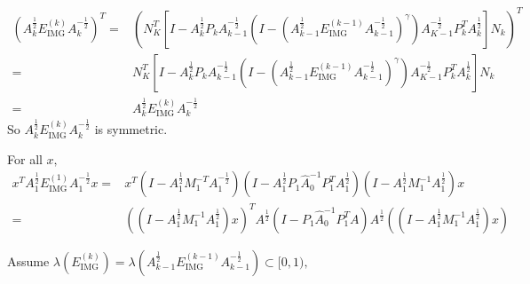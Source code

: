 \documentclass{article}
\begin{document}
\begin{equation*}
    \begin{aligned}
        (A_k^{\frac{1}{2}}E_\text{IMG}^{(k)}A_k^{-\frac{1}{2}})^T= & (N_K^T[I-A_k^{\frac{1}{2}}P_kA_{k-1}^{-\frac{1}{2}}(I-(A_{k-1}^{\frac{1}{2}}E_\text{IMG}^{(k-1)}A_{k-1}^{-\frac{1}{2}})^\gamma)A_{K-1}^{-\frac{1}{2}}P_k^TA_k^{\frac{1}{2}}]N_k)^T \\
        =                                                          & N_K^T[I-A_k^{\frac{1}{2}}P_kA_{k-1}^{-\frac{1}{2}}(I-(A_{k-1}^{\frac{1}{2}}E_\text{IMG}^{(k-1)}A_{k-1}^{-\frac{1}{2}})^\gamma)A_{K-1}^{-\frac{1}{2}}P_k^TA_k^{\frac{1}{2}}]N_k     \\
        =                                                          & A_k^{\frac{1}{2}}E_\text{IMG}^{(k)}A_k^{-\frac{1}{2}}
    \end{aligned}
\end{equation*}
So $A_k^{\frac{1}{2}}E_\text{IMG}^{(k)}A_k^{-\frac{1}{2}}$ is symmetric.

For all $ x,$
\begin{equation*}
    \begin{aligned}
        x^TA_1^{\frac{1}{2}}E_\text{IMG}^{(1)}A_1^{-\frac{1}{2}}x= & x^T (I-A_1^{\frac{1}{2}}M_1^{-T}A_1^{-\frac{1}{2}})(I-A_1^{\frac{1}{2}}P_1\hat{A}_0^{-1}P_1^TA_1^{ \frac{1}{2}})(I-A_1^{\frac{1}{2}}M_1^{-1}A_1^{\frac{1}{2}}) x  \\
        =                                                          & ((I-A_1^{\frac{1}{2}}M_1^{-1}A_1^{\frac{1}{2}}) x )^TA^{\frac{1}{2}}(I-P_1\hat{A}_0^{-1}P_1^TA)A^{\frac{1}{2}}((I-A_1^{\frac{1}{2}}M_1^{-1}A_1^{\frac{1}{2}}) x )
    \end{aligned}
\end{equation*}

Assume $\lambda(E_\text{IMG}^{(k)})=\lambda(A_{k-1}^{\frac{1}{2}}E_\text{IMG}^{(k-1)}A_{k-1}^{-\frac{1}{2}})\subset[0,1),$
\end{document}
